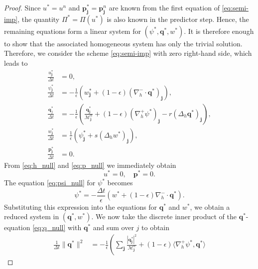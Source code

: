 \documentclass[11pt]{article}
\numberwithin{equation}{section}
\newtheorem{counter example}[theorem]{Counter Example}
\numberwithin{equation}{section}
\numberwithin{equation}{section}
\begin{document}
\begin{proof}
Since $u^*=u^n$ and $\mathbf{p}_{\mathbf{j}}^{*}=\mathbf{p}_{\mathbf{j}}^{n}$ are known from the first equation of \eqref{eq:semi-imp}, the quantity $\Pi^*=\Pi(u^*)$ is also known in the predictor step. Hence, the remaining equations form a linear system for $(\psi^*,\mathbf{q}^*,w^*)$. It is therefore enough to show that the associated homogeneous system has only the trivial solution. Therefore, we consider the scheme  \eqref{eq:semi-imp} with zero right-hand side, which leads to
\begin{subequations}
\label{eq:exist_system}
\begin{align}
\frac{u_{\mathbf{j}}^{*}}{\Delta t} &= 0, \label{eq:h_null}\\
\frac{\psi^*_{\mathbf{j}}}{\Delta t} &= -\frac{1}{\epsilon}\left(w_{\mathbf{j}}^*+(1-\epsilon)(\nabla_h^- \cdot \mathbf{q}^*)_{\mathbf{j}}\right), \label{eq:psi_null}\\
\frac{\mathbf{q}_{j}^{*}}{\Delta t} &= -\frac{1}{\epsilon} \left(\frac{\mathbf{q}_{\mathbf{j}}^*}{\mathcal{M}_{\mathbf{j}}^n}+(1-\epsilon)(\nabla_h^+\psi^*)_{\mathbf{j}}-r(\Delta_h\mathbf{q}^*)_{\mathbf{j}}\right),\label{eq:q_null}\\
\frac{w_{\mathbf{j}}^{*}}{\Delta t} 
&= \frac{1}{\epsilon}\left(\psi^*_{\mathbf{j}}+s(\Delta_h w^*)_{\mathbf{j}}\right),\label{eq:w_null}\\
\frac{\mathbf{p}_{\mathbf{j}}^{*}}{\Delta t} &= 0.\label{eq:p_null}
\end{align}
\end{subequations}
From \eqref{eq:h_null} and \eqref{eq:p_null} we immediately obtain
\begin{equation}
   u^* = 0, \quad \mathbf{p}^* = 0. 
\end{equation}
The equation \eqref{eq:psi_null} for $\psi^*$ becomes
\begin{equation}
\psi^*=-\frac{\Delta t}{\epsilon}\left(w^*+(1-\epsilon)\nabla_h^-\cdot \mathbf{q}^*\right).
\end{equation}
Substituting this expression into the equations for $\mathbf{q}^*$ and $w^*$, we obtain a reduced system in $(\mathbf{q}^*, w^*)$. We now take the discrete inner product of the $\mathbf{q}^*$-equation \eqref{eq:q_null} with $\mathbf{q}^*$ and sum over $j$ to obtain 
\begin{align}
\frac{1}{\Delta t}\|\mathbf{q}^*\|^2
&= -\frac{1}{\epsilon}\left(
\sum_{\mathbf{j}} \frac{|\mathbf{q}_{\mathbf{j}}^*|^2}{\mathcal{M}_{\mathbf{j}}^n}
+ (1-\epsilon)\langle \nabla_h^+ \psi^*, \mathbf{q}^* \rangle

\end{align}
\end{proof}
\end{document}

